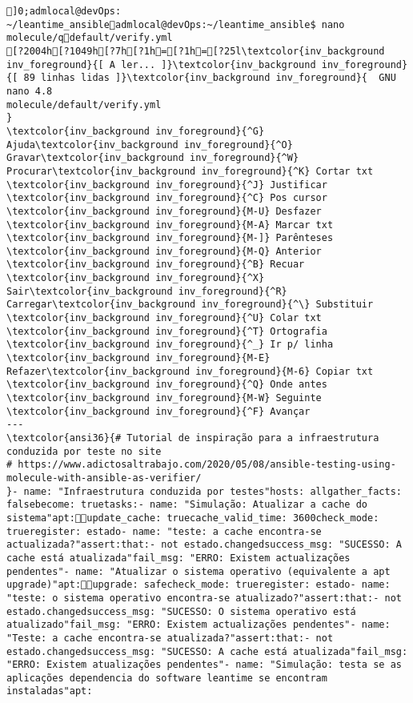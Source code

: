 \documentclass{scrartcl}
\title{}
\begin{document}
\begin{Verbatim}
]0;admlocal@devOps: ~/leantime_ansibleadmlocal@devOps:~/leantime_ansible$ nano molecule/qdefault/verify.yml 
[?2004h[?1049h[?7h[?1h=[?1h=[?25l\textcolor{inv_background inv_foreground}{[ A ler... ]}\textcolor{inv_background inv_foreground}{[ 89 linhas lidas ]}\textcolor{inv_background inv_foreground}{  GNU nano 4.8                                                                    molecule/default/verify.yml                                                                                }
\textcolor{inv_background inv_foreground}{^G} Ajuda\textcolor{inv_background inv_foreground}{^O} Gravar\textcolor{inv_background inv_foreground}{^W} Procurar\textcolor{inv_background inv_foreground}{^K} Cortar txt    \textcolor{inv_background inv_foreground}{^J} Justificar    \textcolor{inv_background inv_foreground}{^C} Pos cursor    \textcolor{inv_background inv_foreground}{M-U} Desfazer     \textcolor{inv_background inv_foreground}{M-A} Marcar txt   \textcolor{inv_background inv_foreground}{M-]} Parênteses   \textcolor{inv_background inv_foreground}{M-Q} Anterior     \textcolor{inv_background inv_foreground}{^B} Recuar
\textcolor{inv_background inv_foreground}{^X} Sair\textcolor{inv_background inv_foreground}{^R} Carregar\textcolor{inv_background inv_foreground}{^\} Substituir    \textcolor{inv_background inv_foreground}{^U} Colar txt     \textcolor{inv_background inv_foreground}{^T} Ortografia    \textcolor{inv_background inv_foreground}{^_} Ir p/ linha   \textcolor{inv_background inv_foreground}{M-E} Refazer\textcolor{inv_background inv_foreground}{M-6} Copiar txt   \textcolor{inv_background inv_foreground}{^Q} Onde antes    \textcolor{inv_background inv_foreground}{M-W} Seguinte     \textcolor{inv_background inv_foreground}{^F} Avançar
---
\textcolor{ansi36}{# Tutorial de inspiração para a infraestrutura conduzida por teste no site
# https://www.adictosaltrabajo.com/2020/05/08/ansible-testing-using-molecule-with-ansible-as-verifier/
}- name: "Infraestrutura conduzida por testes"hosts: allgather_facts: falsebecome: truetasks:- name: "Simulação: Atualizar a cache do sistema"apt:update_cache: truecache_valid_time: 3600check_mode: trueregister: estado- name: "teste: a cache encontra-se actualizada?"assert:that:- not estado.changedsuccess_msg: "SUCESSO: A cache está atualizada"fail_msg: "ERRO: Existem actualizações pendentes"- name: "Atualizar o sistema operativo (equivalente a apt upgrade)"apt:upgrade: safecheck_mode: trueregister: estado- name: "teste: o sistema operativo encontra-se atualizado?"assert:that:- not estado.changedsuccess_msg: "SUCESSO: O sistema operativo está atualizado"fail_msg: "ERRO: Existem actualizações pendentes"- name: "Teste: a cache encontra-se atualizada?"assert:that:- not estado.changedsuccess_msg: "SUCESSO: A cache está atualizada"fail_msg: "ERRO: Existem atualizações pendentes"- name: "Simulação: testa se as aplicações dependencia do software leantime se encontram instaladas"apt:

\end{Verbatim}
\end{document}
